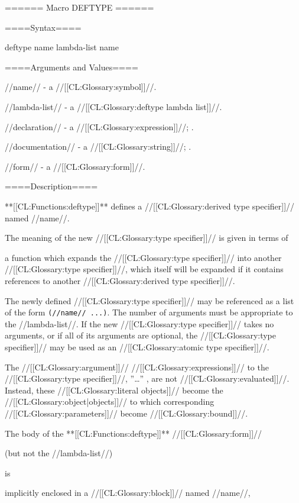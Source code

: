 ====== Macro DEFTYPE ======

====Syntax====

\DefmacWithValues deftype {name lambda-list {\DeclsAndDoc} } {name}

====Arguments and Values====

//name// - a //[[CL:Glossary:symbol]]//.

//lambda-list// - a //[[CL:Glossary:deftype lambda list]]//.

//declaration// - a  //[[CL:Glossary:expression]]//; \noeval.

//documentation// - a //[[CL:Glossary:string]]//; \noeval.

//form// - a //[[CL:Glossary:form]]//.

====Description====

**[[CL:Functions:deftype]]** defines a //[[CL:Glossary:derived type specifier]]// named //name//.

The meaning of the new //[[CL:Glossary:type specifier]]// is given in terms of

a function which expands the //[[CL:Glossary:type specifier]]// into another //[[CL:Glossary:type specifier]]//, which itself will be expanded if it contains references to another //[[CL:Glossary:derived type specifier]]//.

The newly defined //[[CL:Glossary:type specifier]]// may be referenced as a list of the form {\tt (//name//   ...)\/}. The number of arguments must be appropriate to the //lambda-list//. If the new //[[CL:Glossary:type specifier]]// takes no arguments, or if all of its arguments are optional, the //[[CL:Glossary:type specifier]]// may be used as an //[[CL:Glossary:atomic type specifier]]//.

The //[[CL:Glossary:argument]]// //[[CL:Glossary:expressions]]// to the //[[CL:Glossary:type specifier]]//,  ''\ldots'' , are not //[[CL:Glossary:evaluated]]//. Instead, these //[[CL:Glossary:literal objects]]// become the //[[CL:Glossary:object|objects]]// to which corresponding //[[CL:Glossary:parameters]]// become //[[CL:Glossary:bound]]//.

The body of the **[[CL:Functions:deftype]]** //[[CL:Glossary:form]]//

(but not the //lambda-list//)

is

implicitly enclosed in a //[[CL:Glossary:block]]// named //name//,

